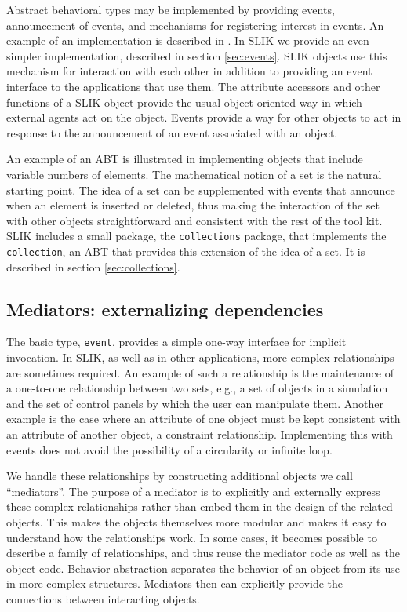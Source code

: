 \documentclass[twoside,openright,11pt]{report}
\newcommand{\tp}[1]{\texttt{#1}}
\begin{document}
Abstract behavioral types may be implemented by providing events,
announcement of events, and mechanisms for registering interest in
events.  An example of an implementation is described in
\cite{mcdonald91a}.  In SLIK we provide an even simpler
implementation, described in section \ref{sec:events}.  SLIK objects
use this mechanism for interaction with each other in addition to
providing an event interface to the applications that use them.  The
attribute accessors and other functions of a SLIK object provide the
usual object-oriented way in which external agents act on the object.
Events provide a way for other objects to act in response to the
announcement of an event associated with an object.

An example of an ABT is illustrated in implementing objects that
include variable numbers of elements.  The mathematical notion of a
set is the natural starting point.  The idea of a set can be
supplemented with events that announce when an element is inserted or
deleted, thus making the interaction of the set with other objects
straightforward and consistent with the rest of the tool kit.  SLIK
includes a small package, the \tp{collections} package, that
implements the \tp{collection}, an ABT that provides this extension of
the idea of a set.  It is described in section \ref{sec:collections}.

\subsection{Mediators: externalizing dependencies}

The basic type, \tp{event}, provides a simple one-way interface for
implicit invocation.  In SLIK, as well as in other applications, more
complex relationships are sometimes required.  An example of such a
relationship is the maintenance of a one-to-one relationship between
two sets, e.g., a set of objects in a simulation and the set of
control panels by which the user can manipulate them.  Another example
is the case where an attribute of one object must be kept consistent
with an attribute of another object, a constraint relationship.
Implementing this with events does not avoid the possibility of a
circularity or infinite loop.

We handle these relationships by constructing additional objects we
call ``mediators''.  The purpose of a mediator is to explicitly and
externally express these complex relationships rather than embed them
in the design of the related objects.  This makes the objects
themselves more modular and makes it easy to understand how the
relationships work.  In some cases, it becomes possible to describe a
family of relationships, and thus reuse the mediator code as well as
the object code.  Behavior abstraction separates the behavior of an
object from its use in more complex structures.  Mediators then can
explicitly provide the connections between interacting objects.
\end{document}
